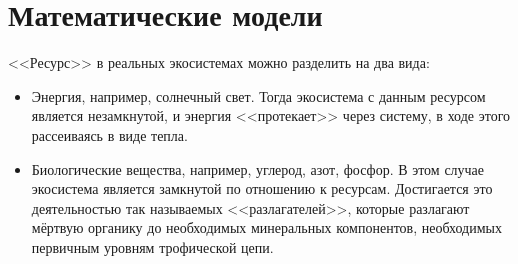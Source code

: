\section{Математические модели}
    <<Ресурс>> в реальных экосистемах можно разделить на два вида:
    \begin{itemize}
        \item Энергия, например, солнечный свет. Тогда экосистема с данным ресурсом является незамкнутой, и энергия <<протекает>> через систему, в ходе этого рассеиваясь в виде тепла.
        \item Биологические вещества, например, углерод, азот, фосфор. В этом случае экосистема является замкнутой по отношению к ресурсам. Достигается это деятельностью так называемых <<разлагателей>>, которые разлагают мёртвую органику до необходимых минеральных компонентов, необходимых первичным уровням трофической цепи.
    \end{itemize}
    
